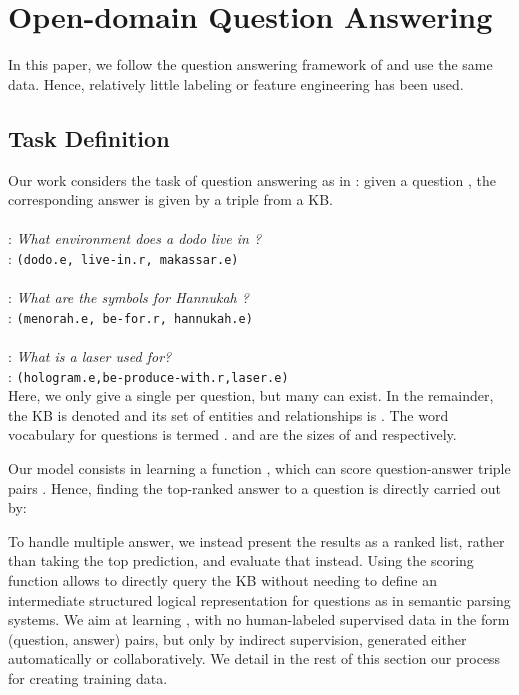 \documentclass[runningheads,a4paper]{llncs}
\newcommand{\kb}[1]{{\small\texttt{#1}}\xspace}
\newcommand{\ab}[1]{{\color{black}{#1}}}
\begin{document}
\section{Open-domain Question Answering}
\label{sec:qa}

In this paper, we follow the question answering framework of \cite{paralex} and use the same data. Hence, relatively little labeling or feature engineering has been used.



\subsection{Task Definition}

Our work considers the task of question answering as in \cite{paralex}: given a question , the corresponding answer is given by a triple  from a KB.
\ab{This means that we consider questions for which a set of triples  provide an interpretation of the question and its answer, such as:}\\
~\\
: {\it What environment does a dodo live in ?}\\
: \kb{(dodo.e, live-in.r, makassar.e)}\\
~\\
: {\it What are the symbols for Hannukah ?}\\
: \kb{(menorah.e, be-for.r, hannukah.e)}\\
~\\
: {\it What is a laser used for?}\\
: \kb{(hologram.e,be-produce-with.r,laser.e)}\\

Here, we only give a single  per question, but many can exist.
In the remainder, the KB is denoted  and its set of entities and relationships is .
The word vocabulary for questions is termed .
 and  are the sizes of  and  respectively. 

Our model consists in learning a function , which can score question-answer triple pairs . Hence, finding the top-ranked answer  to  a question  is directly carried out by:

To handle multiple answer, we instead present the results as a ranked list, rather than taking the top prediction, and evaluate that instead. 
Using the scoring function  allows to directly query the KB without needing to define an intermediate structured logical representation for questions as in semantic parsing systems. 
We aim at learning , with no human-labeled supervised 
data in the form (question, answer) pairs,
but only by indirect supervision,
generated either automatically or collaboratively. 
We detail in the rest of this section our process for creating training data.
\end{document}
